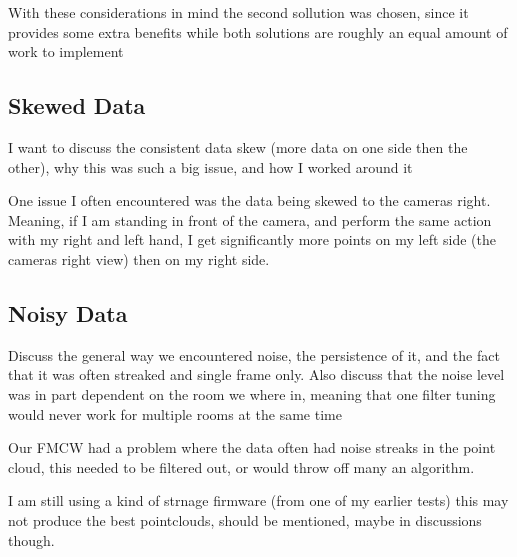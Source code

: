 With these considerations in mind the second sollution was chosen, since it provides some extra benefits while both solutions are roughly an equal amount of work to implement

\subsection{Skewed Data}
\label{sub-section: methodology - issues - skewed data}
I want to discuss the consistent data skew (more data on one side then the other), why this was such a big issue, and how I worked around it

One issue I often encountered was the data being skewed to the cameras right. Meaning, if I am standing in front of the camera, and perform the same action with my right and left hand, I get significantly more points on my left side (the cameras right view) then on my right side.

\subsection{Noisy Data}
\label{sub-section: methodology - issues - noisy data}
Discuss the general way we encountered noise, the persistence of it, and the fact that it was often streaked and single frame only.
Also discuss that the noise level was in part dependent on the room we where in, meaning that one filter tuning would never work for multiple rooms at the same time

Our FMCW had a problem where the data often had noise streaks in the point cloud, this needed to be filtered out, or would throw off many an algorithm.

I am still using a kind of strnage firmware (from one of my earlier tests) this may not produce the best pointclouds, should be mentioned, maybe in discussions though.



